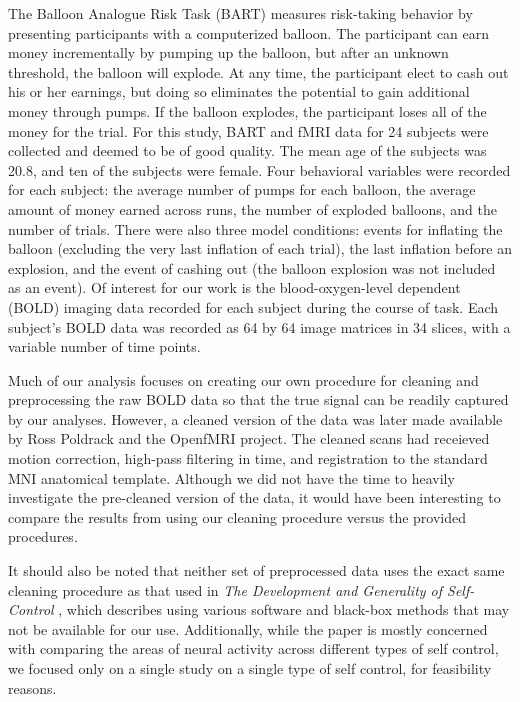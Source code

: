 \par \indent The Balloon Analogue Risk Task (BART) measures risk-taking 
behavior by presenting participants with a computerized balloon. The 
participant can earn money incrementally by pumping up the balloon, but after 
an unknown threshold, the balloon will explode. At any time, the participant 
elect to cash out his or her earnings, but doing so eliminates the potential 
to gain additional money through pumps. If the balloon explodes, the 
participant loses all of the money for the trial. For this study, BART and 
fMRI data for 24 subjects were collected and deemed to be of good quality. 
The mean age of the subjects was 20.8, and ten of the subjects were female. 
Four behavioral variables were recorded for each subject: the average number 
of pumps for each balloon, the average amount of money earned across runs, the 
number of exploded balloons, and the number of trials. There were also three 
model conditions: events for inflating the balloon (excluding the very last 
inflation of each trial), the last inflation before an explosion, and the 
event of cashing out (the balloon explosion was not included as an event). Of 
interest for our work is the blood-oxygen-level dependent (BOLD) imaging data 
recorded for each subject during the course of task. Each subject's BOLD data 
was recorded as 64 by 64 image matrices in 34 slices, with a variable number 
of time points. 

\par Much of our analysis focuses on creating our own procedure for cleaning 
and preprocessing the raw BOLD data so that the true signal can be readily 
captured by our analyses. However, a cleaned version of the data was later 
made available by Ross Poldrack and the OpenfMRI project. The cleaned scans 
had receieved motion correction, high-pass filtering in time, and registration 
to the standard MNI anatomical template. Although we did not have the time to 
heavily investigate the pre-cleaned version of the data, it would have been 
interesting to compare the results from using our cleaning procedure versus 
the provided procedures.

\par It should also be noted that neither set of preprocessed data uses the 
exact same cleaning procedure as that used in \textit{The Development and 
Generality of Self-Control} \cite{CohenSelfControl}, which describes using 
various software and black-box methods that may not be available for our use. 
Additionally, while the paper is mostly concerned with comparing the areas of 
neural activity across different types of self control, we focused only on a 
single study on a single type of self control, for feasibility reasons. 
